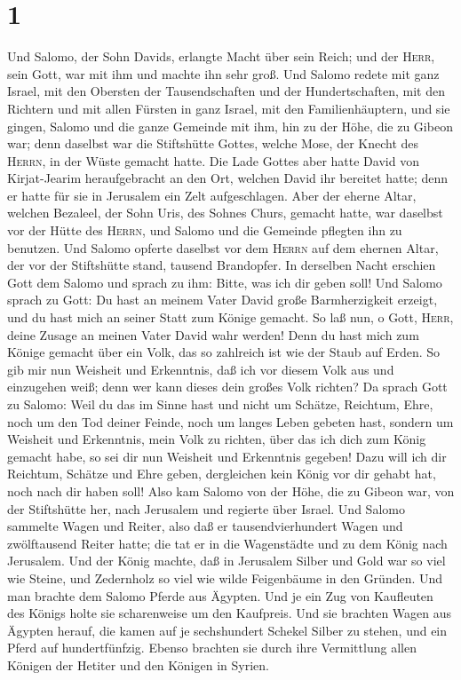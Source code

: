 \hypertarget{section}{%
\section{1}\label{section}}

 Und Salomo, der Sohn Davids, erlangte Macht über sein
Reich; und der \textsc{Herr}, sein Gott, war mit ihm und machte ihn sehr
groß.  Und Salomo redete mit ganz Israel, mit den Obersten
der Tausendschaften und der Hundertschaften, mit den Richtern und mit
allen Fürsten in ganz Israel, mit den Familienhäuptern, 
und sie gingen, Salomo und die ganze Gemeinde mit ihm, hin zu der Höhe,
die zu Gibeon war; denn daselbst war die Stiftshütte Gottes, welche
Mose, der Knecht des \textsc{Herrn}, in der Wüste gemacht hatte.
 Die Lade Gottes aber hatte David von Kirjat-Jearim
heraufgebracht an den Ort, welchen David ihr bereitet hatte; denn er
hatte für sie in Jerusalem ein Zelt aufgeschlagen.  Aber
der eherne Altar, welchen Bezaleel, der Sohn Uris, des Sohnes Churs,
gemacht hatte, war daselbst vor der Hütte des \textsc{Herrn}, und Salomo
und die Gemeinde pflegten ihn zu benutzen.  Und Salomo
opferte daselbst vor dem \textsc{Herrn} auf dem ehernen Altar, der vor
der Stiftshütte stand, tausend Brandopfer.  In derselben
Nacht erschien Gott dem Salomo und sprach zu ihm: Bitte, was ich dir
geben soll!  Und Salomo sprach zu Gott: Du hast an meinem
Vater David große Barmherzigkeit erzeigt, und du hast mich an seiner
Statt zum Könige gemacht.  So laß nun, o Gott,
\textsc{Herr}, deine Zusage an meinen Vater David wahr werden! Denn du
hast mich zum Könige gemacht über ein Volk, das so zahlreich ist wie der
Staub auf Erden.  So gib mir nun Weisheit und Erkenntnis,
daß ich vor diesem Volk aus und einzugehen weiß; denn wer kann dieses
dein großes Volk richten?  Da sprach Gott zu Salomo: Weil
du das im Sinne hast und nicht um Schätze, Reichtum, Ehre, noch um den
Tod deiner Feinde, noch um langes Leben gebeten hast, sondern um
Weisheit und Erkenntnis, mein Volk zu richten, über das ich dich zum
König gemacht habe,  so sei dir nun Weisheit und
Erkenntnis gegeben! Dazu will ich dir Reichtum, Schätze und Ehre geben,
dergleichen kein König vor dir gehabt hat, noch nach dir haben soll!
 Also kam Salomo von der Höhe, die zu Gibeon war, von der
Stiftshütte her, nach Jerusalem und regierte über Israel.
 Und Salomo sammelte Wagen und Reiter, also daß er
tausendvierhundert Wagen und zwölftausend Reiter hatte; die tat er in
die Wagenstädte und zu dem König nach Jerusalem.  Und der
König machte, daß in Jerusalem Silber und Gold war so viel wie Steine,
und Zedernholz so viel wie wilde Feigenbäume in den Gründen.
 Und man brachte dem Salomo Pferde aus Ägypten. Und je
ein Zug von Kaufleuten des Königs holte sie scharenweise um den
Kaufpreis.  Und sie brachten Wagen aus Ägypten herauf,
die kamen auf je sechshundert Schekel Silber zu stehen, und ein Pferd
auf hundertfünfzig. Ebenso brachten sie durch ihre Vermittlung allen
Königen der Hetiter und den Königen in Syrien.

